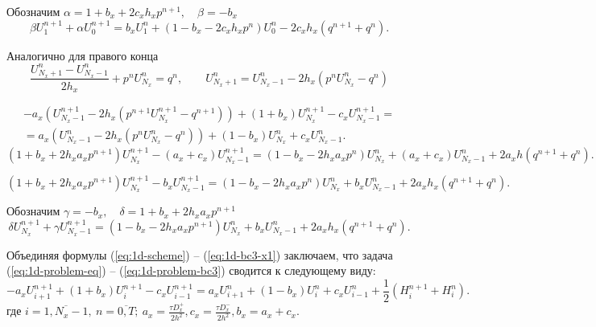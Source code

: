 \documentclass[a4paper,12pt]{article}
\begin{document}
Обозначим $\alpha = 1 + b_x  + 2 c_x h_x p^{n+1}, \quad \beta = - b_x$
\begin{equation}
  \label{eq:1d-bc3-x0}
  \beta U^{n+1}_{1} + \alpha U^{n+1}_{0} =
  b_x U^{n}_{1} + \left(1 - b_x - 2 c_x h_x p^n \right) U^{n}_{0} - 2 c_x h_x (q^{n+1} + q^{n}).
\end{equation}

Аналогично для правого конца
\begin{equation*}
  \frac{U^{n}_{N_x+1} -  U^{n}_{N_x-1}}{2 h_x} + p^n U^n_{N_x}  = q^{n}, \qquad
  U^{n}_{N_x+1}  = U^{n}_{N_x-1} - 2 h_x \left( p^n U^n_{N_x} - q^{n} \right)
\end{equation*}

\begin{multline*}
  - a_x \left( U^{n+1}_{N_x-1} - 2 h_x \left( p^{n+1} U^{n+1}_{N_x} - q^{n+1} \right) \right) + \left( 1 + b_x \right) U^{n+1}_{N_x} - c_x U^{n+1}_{N_x-1} = \\
  = a_x \left(U^{n}_{N_x-1} - 2 h_x \left( p^n U^n_{N_x} - q^{n} \right) \right) + \left(1 - b_x  \right) U^{n}_{N_x} + c_x U^{n}_{N_x-1}.
\end{multline*}
\begin{equation*}
  \left( 1 + b_x + 2 h_x a_x p^{n+1} \right) U^{n+1}_{N_x}  - (a_x + c_x) U^{n+1}_{N_x-1}  = \left(1 - b_x - 2 h_x a_x p^{n} \right) U^{n}_{N_x} + (a_x + c_x) U^{n}_{N_x-1} + 2 a_x h \left( q^{n+1} + q^{n} \right).
\end{equation*}

\begin{equation}
  \left( 1 + b_x + 2 h_x a_x p^{n+1} \right) U^{n+1}_{N_x}  - b_x U^{n+1}_{N_x-1}  = \left(1 - b_x - 2 h_x a_x p^{n} \right) U^{n}_{N_x} + b_x U^{n}_{N_x-1} + 2 a_x h_x \left( q^{n+1} + q^{n} \right).
\end{equation}

Обозначим $\gamma = - b_x, \quad \delta = 1 + b_x + 2 h_x a_x p^{n+1}$
\begin{equation}
  \label{eq:1d-bc3-x1}
  \delta U^{n+1}_{N_x} + \gamma U^{n+1}_{N_x-1}  = \left(1 - b_x - 2 h_x a_x p^{n+1} \right) U^{n}_{N_x} + b_x U^{n}_{N_x-1} + 2 a_x h_x \left( q^{n+1} + q^{n} \right).
\end{equation}


\hrulefill

Объединяя формулы (\ref{eq:1d-scheme}) -- (\ref{eq:1d-bc3-x1}) заключаем, что задача (\ref{eq:1d-problem-eq}) -- (\ref{eq:1d-problem-bc3}) сводится к следующему виду:
\begin{equation*}
  - a_x U^{n+1}_{i+1} + \left(1 + b_x \right) U^{n+1}_{i} - c_x U^{n+1}_{i-1} = a_x U^{n}_{i+1} + \left(1 - b_x \right) U^{n}_{i} + c_x U^{n}_{i-1} + \frac{1}{2} \left( H^{n+1}_i + H^{n}_i \right).
\end{equation*}
где $i = \overline {1, N_x-1}, \ n = \overline{0,T}; \ a_x = \frac{\tau D^+_x}{2h^2}, c_x = \frac{\tau D^-_x}{2h^2}, b_x = a_x + c_x$.
\end{document}
